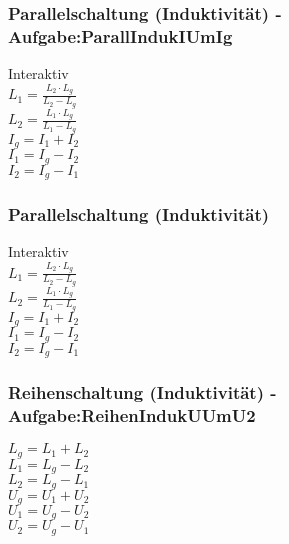 \subsubsection{Parallelschaltung (Induktivität) - Aufgabe:ParallIndukIUmIg} 
\begin{minipage}{0.45\textwidth} 
Interaktiv\\ 
$ L_{1}  = \frac{L_{2} \cdot L_{g} }{L_{2} -L_{g} } $\\ 
$ L_{2}  = \frac{L_{1} \cdot L_{g} }{L_{1} -L_{g} } $\\ 
$ I_{g}  = I_{1}  + I_{2} $\\ 
$ I_{1}  = I_{g}  - I_{2} $\\ 
$ I_{2}  = I_{g}  - I_{1} $\\ 
\end{minipage} 
\begin{minipage}{0.45\textwidth} 
 
\end{minipage} 
\subsubsection{Parallelschaltung (Induktivität)} 
\begin{minipage}{0.45\textwidth} 
Interaktiv\\ 
$ L_{1}  = \frac{L_{2} \cdot L_{g} }{L_{2} -L_{g} } $\\ 
$ L_{2}  = \frac{L_{1} \cdot L_{g} }{L_{1} -L_{g} } $\\ 
$ I_{g}  = I_{1}  + I_{2} $\\ 
$ I_{1}  = I_{g}  - I_{2} $\\ 
$ I_{2}  = I_{g}  - I_{1} $\\ 
\end{minipage} 
\begin{minipage}{0.45\textwidth} 
 
\end{minipage} 
\subsubsection{Reihenschaltung (Induktivität) - Aufgabe:ReihenIndukUUmU2} 
\begin{minipage}{0.45\textwidth} 
$ L_{g}  = L_{1}  + L_{2} $\\ 
$ L_{1}  = L_{g}  - L_{2} $\\ 
$ L_{2}  = L_{g}  - L_{1} $\\ 
$ U_{g}  = U_{1}  + U_{2} $\\ 
$ U_{1}  = U_{g}  - U_{2} $\\ 
$ U_{2}  = U_{g}  - U_{1} $\\ 
\end{minipage} 
\begin{minipage}{0.45\textwidth} 
 
\end{minipage} 
